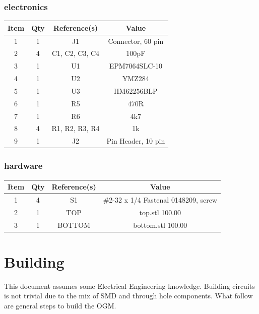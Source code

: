 \subsubsection{electronics}
\begin{footnotesize}
\begin{longtable}{ |*{4}{c|} }
\hline
{Item} & {Qty} & {Reference(s)} & {Value} \\
\hline
{1} & {1} & {J1} & {Connector, 60 pin} \\
\hline
{2} & {4} & {C1, C2, C3, C4} & {100pF} \\
\hline
{3} & {1} & {U1} & {EPM7064SLC-10} \\
\hline
{4} & {1} & {U2} & {YMZ284} \\
\hline
{5} & {1} & {U3} & {HM62256BLP} \\
\hline
{6} & {1} & {R5} & {470R} \\
\hline
{7} & {1} & {R6} & {4k7} \\
\hline
{8} & {4} & {R1, R2, R3, R4} & {1k} \\
\hline
{9} & {1} & {J2} & {Pin Header, 10 pin} \\
\hline
\end{longtable}
\end{footnotesize}

\subsubsection{hardware}
\begin{footnotesize}
\begin{longtable}{ |*{4}{c|} }
\hline
{Item} & {Qty} & {Reference(s)} & {Value} \\
\hline
{1} & {4} & {S1} & {\#2-32 x 1/4 Fastenal 0148209, screw} \\
\hline
{2} & {1} & {TOP} & {top.stl 100.00} \\
\hline
{3} & {1} & {BOTTOM} & {bottom.stl 100.00} \\
\hline
\end{longtable}
\end{footnotesize}

\section{Building}

\par
This document assumes some Electrical Engineering knowledge. Building circuits is not
trivial due to the mix of SMD and through hole components. What follow are general
steps to build the OGM.

